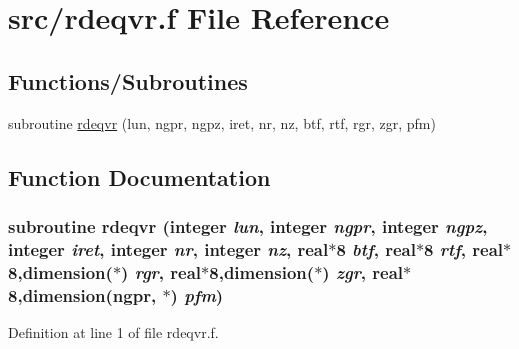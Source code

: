 \hypertarget{rdeqvr_8f}{
\section{src/rdeqvr.f File Reference}
\label{rdeqvr_8f}
}
\subsection*{Functions/Subroutines}
\begin{CompactItemize}
\item 
subroutine \hyperlink{rdeqvr_8f_288409707b84c12795e31acb329ce87a}{rdeqvr} (lun, ngpr, ngpz, iret, nr, nz, btf, rtf, rgr, zgr, pfm)
\end{CompactItemize}


\subsection{Function Documentation}
\hypertarget{rdeqvr_8f_288409707b84c12795e31acb329ce87a}{
\subsubsection[rdeqvr]{\setlength{\rightskip}{0pt plus 5cm}subroutine rdeqvr (integer {\em lun}, \/  integer {\em ngpr}, \/  integer {\em ngpz}, \/  integer {\em iret}, \/  integer {\em nr}, \/  integer {\em nz}, \/  real$\ast$8 {\em btf}, \/  real$\ast$8 {\em rtf}, \/  real$\ast$8,dimension($\ast$) {\em rgr}, \/  real$\ast$8,dimension($\ast$) {\em zgr}, \/  real$\ast$8,dimension(ngpr, $\ast$) {\em pfm})}}
\label{rdeqvr_8f_288409707b84c12795e31acb329ce87a}




Definition at line 1 of file rdeqvr.f.